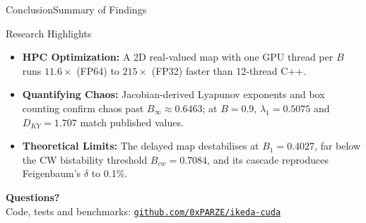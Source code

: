 \documentclass[aspectratio=169]{beamer}
\begin{document}
\begin{frame}{Conclusion}{Summary of Findings}
    \vspace{-0.5cm}
    \begin{customblock}{Research Highlights}
        \small
        \begin{itemize}
            \setlength{\itemsep}{0.1cm}
            \item \textbf{HPC Optimization:} A 2D real-valued map with one GPU thread per $B$ runs $11.6\times$ (FP64) to $215\times$ (FP32) faster than 12-thread C++.
            \item \textbf{Quantifying Chaos:} Jacobian-derived Lyapunov exponents and box counting confirm chaos past $B_\infty \approx 0.6463$; at $B = 0.9$, $\lambda_1 = 0.5075$ and $D_{KY} = 1.707$ match published values.
            \item \textbf{Theoretical Limits:} The delayed map destabilises at $B_1 = 0.4027$, far below the CW bistability threshold $B_{cw} = 0.7084$, and its cascade reproduces Feigenbaum's $\delta$ to 0.1\%.
        \end{itemize}
    \end{customblock}
    
    \vspace{-0.1cm}
    \begin{center}
        {\LARGE \textbf{Questions?}} \\[0.05cm]
        {\small \color{bluegray} Code, tests and benchmarks: \href{https://github.com/0xPARZE/ikeda-cuda}{\texttt{github.com/0xPARZE/ikeda-cuda}}}
    \end{center}
\end{frame}
\end{document}
